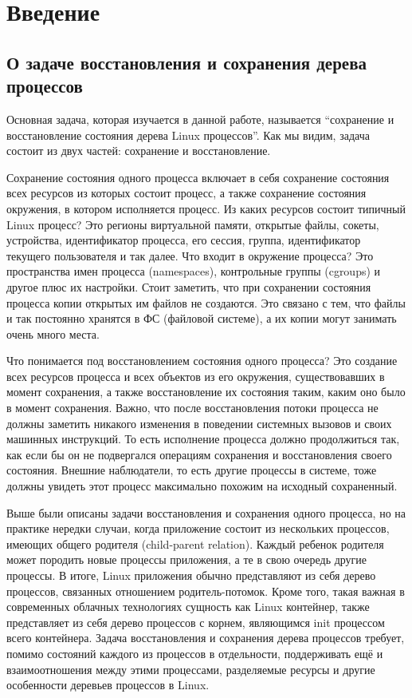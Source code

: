 

\chapter{Введение}

\section{О задаче восстановления и сохранения дерева процессов}
 
Основная задача, которая изучается в данной работе, называется “сохранение и восстановление состояния дерева Linux процессов”. Как мы видим, задача состоит из двух частей: сохранение и восстановление.
 
Сохранение состояния одного процесса включает в себя сохранение состояния всех ресурсов из которых состоит процесс, а также
сохранение состояния окружения, в котором исполняется процесс. Из каких ресурсов состоит типичный Linux процесс? Это 
регионы виртуальной памяти, открытые файлы, сокеты, устройства, идентификатор процесса, его сессия, группа, 
идентификатор текущего пользователя и так далее. Что входит в окружение процесса? Это пространства имен процесса 
(namespaces), контрольные группы (cgroups) и другое плюс их настройки. Стоит заметить, что при сохранении состояния 
процесса копии открытых им файлов не создаются. Это связано с тем, что файлы и так постоянно хранятся в ФС 
(файловой системе), а их копии могут занимать очень много места.

Что понимается под восстановлением состояния одного процесса? Это создание всех ресурсов процесса и всех объектов из его 
окружения, существовавших в момент сохранения, а также восстановление их состояния таким, каким оно было в момент 
сохранения. Важно, что после восстановления потоки процесса не должны заметить никакого изменения в поведении 
системных вызовов и своих машинных инструкций. То есть исполнение процесса должно продолжиться так, как если бы он не 
подвергался операциям сохранения и восстановления своего состояния. Внешние наблюдатели, то есть другие процессы в 
системе, тоже должны увидеть этот процесс максимально похожим на исходный сохраненный.

Выше были описаны задачи восстановления и сохранения одного процесса, но на практике нередки случаи, когда приложение состоит из нескольких процессов, имеющих общего родителя 
(child-parent relation). Каждый ребенок родителя может породить новые процессы приложения, а те в свою очередь другие 
процессы. В итоге, Linux приложения обычно представляют из себя дерево процессов, связанных отношением 
родитель-потомок. Кроме того, такая важная в современных облачных технологиях сущность как Linux контейнер, также 
представляет из себя дерево процессов с корнем, являющимся init процессом всего контейнера. Задача восстановления и 
сохранения дерева процессов требует, помимо состояний каждого из процессов в отдельности, поддерживать ещё и 
взаимоотношения между этими процессами, разделяемые ресурсы и другие особенности деревьев процессов в Linux.

